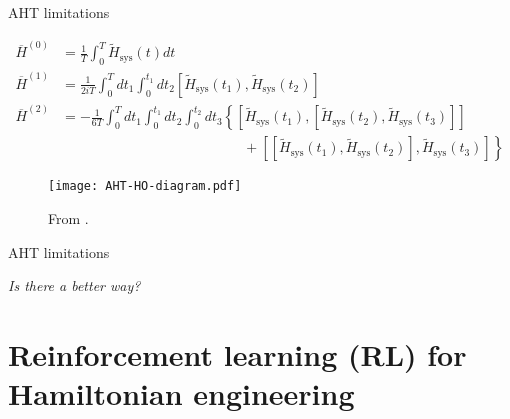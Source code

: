 \documentclass{beamer}
\begin{document}
\begin{frame}{AHT limitations}

{\scriptsize %
\begin{align*}
    \overline{H}^{(0)} &= \frac{1}{T} \int_0^{T}
        \widetilde{H}_{\text{sys}}(t) dt \\
    \overline{H}^{(1)} &= \frac{1}{2iT} \int_0^{T} dt_1 \int_0^{t_1} dt_2
        \left[\widetilde{H}_{\text{sys}}(t_1), \widetilde{H}_{\text{sys}}(t_2)\right] \\
    \overline{H}^{(2)} &= -\frac{1}{6T}
    \int_0^{T} dt_1 \int_0^{t_1} dt_2 \int_0^{t_2} dt_3
    \left\{
    \left[\widetilde{H}_{\text{sys}}(t_1), \left[\widetilde{H}_{\text{sys}}(t_2), \widetilde{H}_{\text{sys}}(t_3)\right]\right] \right. \\
    & \hspace{13em} + \left.
    \left[\left[\widetilde{H}_{\text{sys}}(t_1), \widetilde{H}_{\text{sys}}(t_2)\right], \widetilde{H}_{\text{sys}}(t_3)\right]
    \right\}
\end{align*}
}
\vspace{-1em}
\begin{figure}
\centering
\texttt{[image: AHT-HO-diagram.pdf]}

{\scriptsize From \cite{brinkmann_2016}.}
\end{figure}


\end{frame}


\begin{frame}{AHT limitations}


\emph{Is there a better way?}

\end{frame}



\section{Reinforcement learning (RL) for Hamiltonian engineering}
\end{document}
